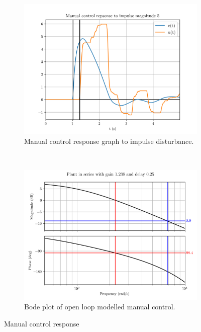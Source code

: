 \documentclass[8pt]{article}
\begin{document}
\begin{figure}[H]
    \centering
    \begin{subfigure}[t]{0.48\textwidth}
        \centering
        \includegraphics[width=1\textwidth]{figures/FIGURE_1.png}
        \caption{Manual control response graph to impulse disturbance.}
        \label{fig:figure1}
    \end{subfigure}
    ~
    \begin{subfigure}[t]{0.48\textwidth}
        \centering
        \includegraphics[width=1\textwidth]{figures/FIGURE_2.png}
        \caption{Bode plot of open loop modelled manual control.}
        \label{fig:figure2}
    \end{subfigure}
    \caption{Manual control response}
\end{figure}
\end{document}
